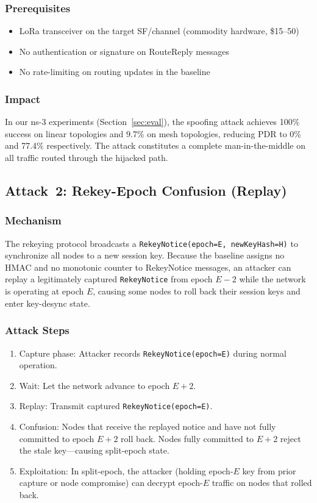 \documentclass[journal]{IEEEtran}
\begin{document}
\subsubsection{Prerequisites}
\begin{itemize}
  \item LoRa transceiver on the target SF/channel (commodity hardware,
    \$15–50)
  \item No authentication or signature on RouteReply messages
  \item No rate-limiting on routing updates in the baseline
\end{itemize}

\subsubsection{Impact}
In our ns-3 experiments (Section~\ref{sec:eval}), the spoofing attack
achieves 100\% success on linear topologies and 9.7\% on mesh
topologies, reducing PDR to 0\% and 77.4\% respectively. The attack
constitutes a complete man-in-the-middle on all traffic routed through
the hijacked path.

\subsection{Attack~2: Rekey-Epoch Confusion (Replay)}

\subsubsection{Mechanism}

The rekeying protocol broadcasts a \texttt{RekeyNotice(epoch=E,
newKeyHash=H)} to synchronize all nodes to a new session key. Because
the baseline assigns no HMAC and no monotonic counter to RekeyNotice
messages, an attacker can replay a legitimately captured
\texttt{RekeyNotice} from epoch $E-2$ while the network is
operating at epoch $E$, causing some nodes to roll back their
session keys and enter key-desync state.

\subsubsection{Attack Steps}
\begin{enumerate}
  \item Capture phase: Attacker records \texttt{RekeyNotice(epoch=E)}
    during normal operation.
  \item Wait: Let the network advance to epoch $E+2$.
  \item Replay: Transmit captured \texttt{RekeyNotice(epoch=E)}.
  \item Confusion: Nodes that receive the replayed notice and have not
    fully committed to epoch $E+2$ roll back. Nodes fully committed
    to $E+2$ reject the stale key—causing split-epoch state.
  \item Exploitation: In split-epoch, the attacker (holding epoch-$E$
    key from prior capture or node compromise) can decrypt epoch-$E$
    traffic on nodes that rolled back.
\end{enumerate}
\end{document}
